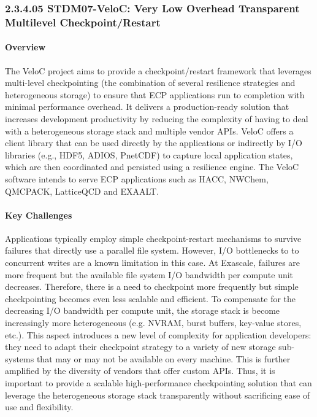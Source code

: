 \subsubsection{2.3.4.05 STDM07-VeloC: Very Low Overhead Transparent Multilevel Checkpoint/Restart} 


\paragraph{Overview} 

The VeloC project aims to provide a checkpoint/restart framework that
leverages multi-level checkpointing (the combination of several
resilience strategies and heterogeneous storage) to ensure that ECP
applications run to completion with minimal performance overhead. It
delivers a production-ready solution that increases development
productivity by reducing the complexity of having to deal with a
heterogeneous storage stack and multiple vendor APIs. VeloC offers a
client library that can be used directly by the applications or
indirectly by I/O libraries (e.g., HDF5, ADIOS, PnetCDF) to capture
local application states, which are then coordinated and persisted
using a resilience engine. The VeloC software intends to serve ECP
applications such as HACC, NWChem, QMCPACK, LatticeQCD and EXAALT.

\paragraph{Key Challenges}

Applications typically employ simple checkpoint-restart mechanisms to
survive failures that directly use a parallel file system.  However,
I/O bottlenecks to to concurrent writes are a known limitation in this
case. At Exascale, failures are more frequent but the available file
system I/O bandwidth per compute unit decreases. Therefore, there is a
need to checkpoint more frequently but simple checkpointing becomes
even less scalable and efficient. To compensate for the decreasing I/O
bandwidth per compute unit, the storage stack is become increasingly
more heterogeneous (e.g. NVRAM, burst buffers, key-value stores,
etc.). This aspect introduces a new level of complexity for
application developers: they need to adapt their checkpoint strategy
to a variety of new storage sub-systems that may or may not be
available on every machine. This is further amplified by the diversity
of vendors that offer custom APIs. Thus, it is important to provide
a scalable high-performance checkpointing solution that can leverage
the heterogeneous storage stack transparently without sacrificing
ease of use and flexibility.

